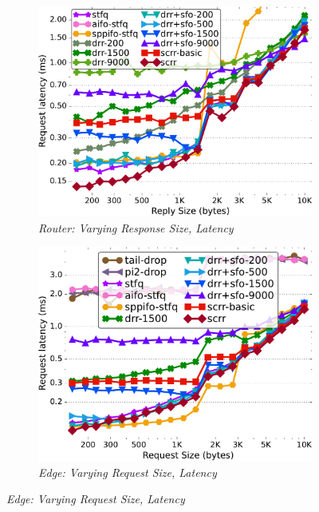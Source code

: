 \begin{figure}[th!]
  \centering
  \begin{subfigure}[t]{.30\linewidth}
    \centering
    \includegraphics[width=0.95\linewidth]{figs/pkt_size_cn_2t4x8_mn_2tb2x4_per_15_mss_1468_lat_comp_drr-200_scrr.pdf}
    \caption{\small{\textit{Router: Varying Response Size, Latency}}}
    \label{fig:reply-1456-latency-sched-full}
  \end{subfigure}
  \begin{subfigure}[t]{.30\linewidth}
    \centering
    \includegraphics[width=0.95\linewidth]{figs/pkt_size_edge_cn_2t1x32_mn_2tb1x8_mss_1468_lat_comp_schys_drr_scrr.pdf}
    \caption{\small{\textit{Edge: Varying Request Size, Latency}}}
    \label{fig:request-edge-1456-latency-sched-full}

\end{subfigure}
\end{figure}
